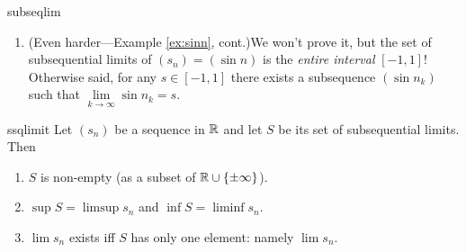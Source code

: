 \begin{examples}{}{subseqlim}
\begin{enumerate}
		\item (Even harder---Example \ref{ex:sinn}, cont.)\lstsp We won't prove it, but the set of subsequential limits of $(s_n)=(\sin n)$ is the \emph{entire interval} $[-1,1]$! Otherwise said, for any $s\in[-1,1]$ there exists a subsequence $(\sin n_k)$ such that $\lim\limits_{k\to\infty}\sin n_k=s$.
		
	\end{enumerate}
\end{examples}


\goodbreak


\begin{thm}{}{ssqlimit}
Let $(s_n)$ be a sequence in $\mathbb{R}$ and let $S$ be its set of subsequential limits. Then
\begin{enumerate}
  \item $S$ is non-empty (as a subset of $\mathbb{R}\cup\{\pm\infty\}$).
  \item $\sup S=\limsup s_n$ and $\inf S=\liminf s_n$.
  \item $\lim s_n$ exists iff $S$ has only one element: namely $\lim s_n$.
\end{enumerate}
\end{thm}

